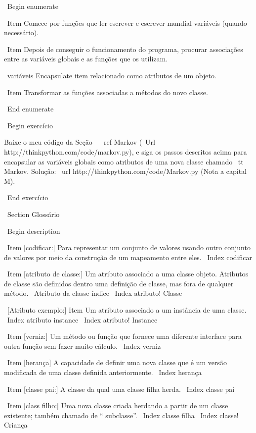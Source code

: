 \documentclass[10pt]{book}
\begin{document}
\begin {itemize}
{{{{{{{{{{{{{{{{{\ Begin {enumerate}

\ Item Comece por funções que ler escrever e escrever mundial
variáveis ​​(quando necessário).

\ Item Depois de conseguir o funcionamento do programa, procurar associações
entre as variáveis ​​globais e as funções que os utilizam.

\ variáveis ​​Encapsulate item relacionado como atributos de um objeto.

\ Item Transformar as funções associadas a métodos do novo
classe.

\ End {enumerate}


\ Begin {} exercício

Baixe o meu código da Seção ~ \ ref {} Markov
(\ Url {http://thinkpython.com/code/markov.py}), e siga os passos descritos
acima para encapsular as variáveis ​​globais como atributos de uma nova classe
chamado {\ tt Markov}. Solução: \ url {http://thinkpython.com/code/Markov.py}
(Nota a capital M).

\ End {} exercício




\ Section {} Glossário

\ Begin {description}

\ Item [codificar:] Para representar um conjunto de valores usando outro
conjunto de valores por meio da construção de um mapeamento entre eles.
\ Index {} codificar

\ Item [atributo de classe:] Um atributo associado a uma classe
objeto. Atributos de classe são definidos dentro
uma definição de classe, mas fora de qualquer método.
\ {Atributo da classe} índice
\ Index {atributo! Classe}

\ [Atributo exemplo:] Item Um atributo associado a um
instância de uma classe.
\ Index {atributo instance}
\ Index {atributo! Instance}

\ Item [verniz:] Um método ou função que fornece uma diferente
interface para outra função sem fazer muito cálculo.
\ Index {verniz}

\ Item [herança] A capacidade de definir uma nova classe que é um
versão modificada de uma classe definida anteriormente.
\ Index {herança}

\ Item [classe pai:] A classe da qual uma classe filha herda.
\ Index {classe pai}

\ Item [class filho:] Uma nova classe criada herdando a partir de um
classe existente; também chamado de `` subclasse''.
\ Index {classe filha}
\ Index {classe! Criança}

}}}}}}}}}}}}}}}}}
\end{itemize}
\end{document}
